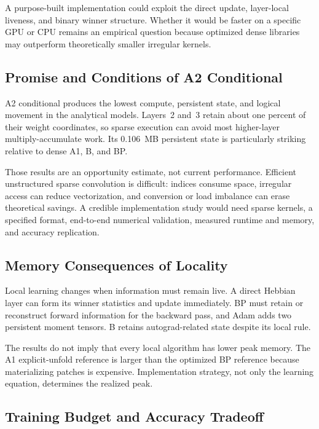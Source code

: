 \documentclass{article}
\begin{document}
    A purpose-built implementation could exploit the direct update, layer-local liveness, and binary winner structure. Whether it would be faster on a specific GPU or CPU remains an empirical question because optimized dense libraries may outperform theoretically smaller irregular kernels.
    
    \subsection{Promise and Conditions of A2 Conditional}
    
    A2 conditional produces the lowest compute, persistent state, and logical movement in the analytical models. Layers~2 and~3 retain about one percent of their weight coordinates, so sparse execution can avoid most higher-layer multiply-accumulate work. Its 0.106~MB persistent state is particularly striking relative to dense A1, B, and BP.
    
    Those results are an opportunity estimate, not current performance. Efficient unstructured sparse convolution is difficult: indices consume space, irregular access can reduce vectorization, and conversion or load imbalance can erase theoretical savings. A credible implementation study would need sparse kernels, a specified format, end-to-end numerical validation, measured runtime and memory, and accuracy replication.
    
    \subsection{Memory Consequences of Locality}
    
    Local learning changes when information must remain live. A direct Hebbian layer can form its winner statistics and update immediately. BP must retain or reconstruct forward information for the backward pass, and Adam adds two persistent moment tensors. B retains autograd-related state despite its local rule.
    
    The results do not imply that every local algorithm has lower peak memory. The A1 explicit-unfold reference is larger than the optimized BP reference because materializing patches is expensive. Implementation strategy, not only the learning equation, determines the realized peak.
    
    \subsection{Training Budget and Accuracy Tradeoff}
    
\end{document}
